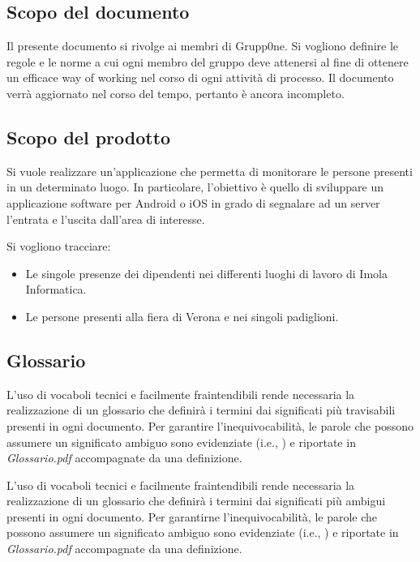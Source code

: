 \documentclass[../norme-di-progetto.tex]{subfiles}
\begin{document}
\subsection{Scopo del documento}%
\label{sub:scopo del documento}

Il presente documento si rivolge ai membri di Grupp0ne.
Si vogliono definire le regole e le norme a cui ogni membro del gruppo deve attenersi al fine di ottenere un efficace way of working nel corso di ogni attività di processo.
Il documento verrà aggiornato nel corso del tempo, pertanto è ancora incompleto.

\subsection{Scopo del prodotto}%
\label{sub:scopo del prodotto}

Si vuole realizzare un'applicazione che permetta di monitorare le persone presenti in un determinato luogo.
In particolare, l'obiettivo è quello di sviluppare un applicazione software per Android o iOS in grado di segnalare ad un server l'entrata e l'uscita dall'area di interesse.

Si vogliono tracciare:

\begin{itemize}
  \item Le singole presenze dei dipendenti nei differenti luoghi di lavoro di Imola Informatica.
  \item Le persone presenti alla fiera di Verona e nei singoli padiglioni.
\end{itemize}

\subsection{Glossario}%
\label{sub:glossario}
L'uso di vocaboli tecnici e facilmente fraintendibili rende necessaria la realizzazione di un glossario che definirà i termini dai significati più travisabili presenti in ogni documento.
Per garantire l'inequivocabilità, le parole che possono assumere un significato ambiguo sono evidenziate (i.e., ) e riportate in \textit{Glossario.pdf} accompagnate da una definizione.

L'uso di vocaboli tecnici e facilmente fraintendibili rende necessaria la realizzazione di un glossario che definirà i termini dai significati più ambigui presenti in ogni documento.
Per garantirne l'inequivocabilità, le parole che possono assumere un significato ambiguo sono evidenziate (i.e., ) e riportate in \textit{Glossario.pdf} accompagnate da una definizione.
\end{document}
